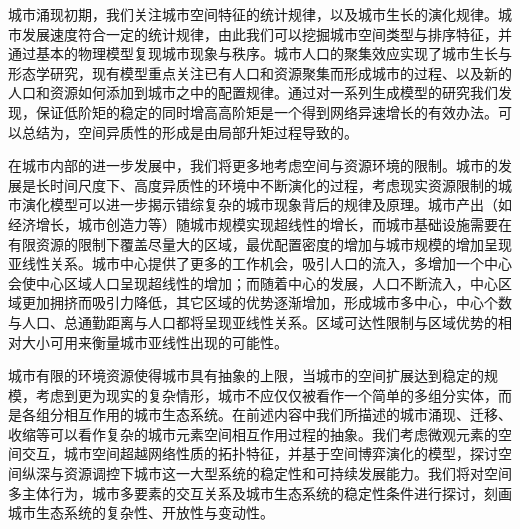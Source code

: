 城市涌现初期，我们关注城市空间特征的统计规律，以及城市生长的演化规律。城市发展速度符合一定的统计规律，由此我们可以挖掘城市空间类型与排序特征，并通过基本的物理模型复现城市现象与秩序\cite{Barthelemy2019}。城市人口的聚集效应实现了城市生长与形态学研究，现有模型重点关注已有人口和资源聚集而形成城市的过程\cite{PhysRevE.58.295,PhysRevLett.112.240601}、以及新的人口和资源如何添加到城市之中的配置规律\cite{ZhangScaling,LiSimple}。通过对一系列生成模型的研究我们发现，保证低阶矩的稳定的同时增高高阶矩是一个得到网络异速增长的有效办法。可以总结为，空间异质性的形成是由局部升矩过程导致的。

在城市内部的进一步发展中，我们将更多地考虑空间与资源环境的限制。城市的发展是长时间尺度下、高度异质性的环境中不断演化的过程，考虑现实资源限制的城市演化模型可以进一步揭示错综复杂的城市现象背后的规律及原理。城市产出（如经济增长，城市创造力等）随城市规模实现超线性的增长\cite{Arbesman2009}，而城市基础设施需要在有限资源的限制下覆盖尽量大的区域，最优配置密度的增加与城市规模的增加呈现亚线性关系\cite{PhysRevE.74.016117}。城市中心提供了更多的工作机会，吸引人口的流入，多增加一个中心会使中心区域人口呈现超线性的增加；而随着中心的发展，人口不断流入，中心区域更加拥挤而吸引力降低，其它区域的优势逐渐增加，形成城市多中心，中心个数与人口、总通勤距离与人口都将呈现亚线性关系\cite{fujita1982multiple,ogawa1989nonmonocentric}。区域可达性限制与区域优势的相对大小可用来衡量城市亚线性出现的可能性。

城市有限的环境资源使得城市具有抽象的上限，当城市的空间扩展达到稳定的规模，考虑到更为现实的复杂情形，城市不应仅仅被看作一个简单的多组分实体，而是各组分相互作用的城市生态系统。在前述内容中我们所描述的城市涌现、迁移、收缩等可以看作复杂的城市元素空间相互作用过程的抽象。我们考虑微观元素的空间交互，城市空间超越网络性质的拓扑特征，并基于空间博弈演化的模型，探讨空间纵深与资源调控下城市这一大型系统的稳定性和可持续发展能力。我们将对空间多主体行为，城市多要素的交互关系及城市生态系统的稳定性条件进行探讨，刻画城市生态系统的复杂性、开放性与变动性。